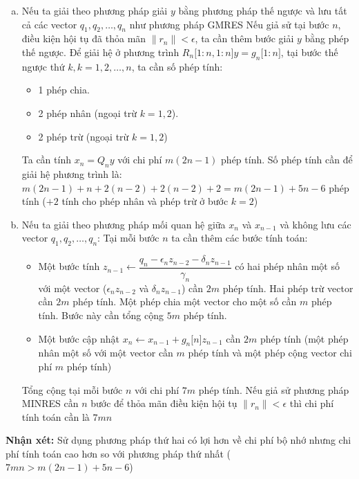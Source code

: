 \documentclass[14pt, a4paper]{article}
\numberwithin{equation}{section}
\numberwithin{algorithm}{section}
\numberwithin{figure}{section}
\numberwithin{dl}{section}
\numberwithin{md}{section}
\numberwithin{bd}{section}
\numberwithin{dn}{section}
\numberwithin{hq}{section}
\begin{document}
\begin{enumerate}[a)] %
    \item Nếu ta giải theo phương pháp giải $y$ bằng phương pháp thế ngược và lưu tất cả các vector $q_1, q_2, \dots, q_n$ như phương pháp GMRES
    Nếu giả sử tại bước $n$, điều kiện hội tụ đã thỏa mãn $\lVert r_n \rVert < \epsilon$, ta cần thêm bước giải $y$ bằng phép thế ngược. Để giải hệ ở phương trình $R_n \lbrack 1:n, 1:n \rbrack y = g_n \lbrack 1:n \rbrack$, tại bước thế ngược thứ $k, k=1,2,\dots,n$, ta cần số phép tính:
    \begin{itemize}
        \item 1 phép chia.
        \item 2 phép nhân (ngoại trừ $k=1,2$).
        \item 2 phép trừ (ngoại trừ $k=1,2$)
    \end{itemize}
    Ta cần tính $x_n = Q_n y$ với chi phí $m(2n-1)$ phép tính.
    Số phép tính cần để giải hệ phương trình là: $m(2n-1) + n + 2(n-2) + 2(n-2) + 2=m(2n-1) + 5n-6$ phép tính ($+2$ tính cho phép nhân và phép trừ ở bước $k=2$)
    \item Nếu ta giải theo phương pháp mối quan hệ giữa $x_n$ và $x_{n-1}$ và không lưu các vector $q_1, q_2, \dots, q_n$:
    Tại mỗi bước $n$ ta cần thêm các bước tính toán:
    \begin{itemize}
        \item Một bước tính $z_{n-1} \leftarrow \dfrac{q_n - \epsilon_n z_{n-2} - \delta_n z_{n-1}}{\gamma_n}$ có hai phép nhân một số với một vector ($\epsilon_n z_{n-2}$ và $\delta_n z_{n-1}$) cần $2m$ phép tính. Hai phép trừ vector cần $2m$ phép tính. Một phép chia một vector cho một số cần $m$ phép tính. Bước này cần tổng cộng $5m$ phép tính.
        \item Một bước cập nhật $x_n \leftarrow x_{n-1} + g_n \lbrack n \rbrack z_{n-1}$ cần $2m$ phép tính (một phép nhân một số với một vector cần $m$ phép tính và một phép cộng vector chi phí $m$ phép tính)
    \end{itemize}
    Tổng cộng tại mỗi bước $n$ với chi phí $7m$ phép tính. Nếu giả sử phương pháp MINRES cần $n$ bước để thỏa mãn điều kiện hội tụ $\lVert r_n \rVert < \epsilon$ thì chi phí tính toán cần là $7mn$
\end{enumerate}

\textbf{Nhận xét:} Sử dụng phương pháp thứ hai có lợi hơn về chi phí bộ nhớ nhưng chi phí tính toán cao hơn so với phương pháp thứ nhất ($7mn > m(2n-1) + 5n - 6$)
\end{document}
